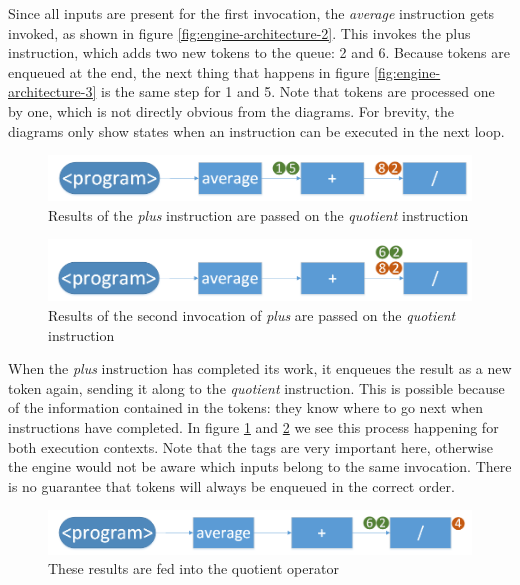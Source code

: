 Since all inputs are present for the first invocation, the \textit{average} instruction gets invoked, as shown in figure \ref{fig:engine-architecture-2}. This invokes the plus instruction, which adds two new tokens to the queue: 2 and 6.
Because tokens are enqueued at the end, the next thing that happens in figure \ref{fig:engine-architecture-3} is the same step for 1 and 5. Note that tokens are processed one by one, which is not directly obvious from the diagrams. For brevity, the diagrams only show states when an instruction can be executed in the next loop.

\begin{figure}[h!]
	\includegraphics[width=\textwidth]{images/Engine-Architecture-4.png}
	\caption{Results of the \textit{plus} instruction are passed on the \textit{quotient} instruction}
	\label{fig:engine-architecture-4}
\end{figure} 

\begin{figure}[h!]
	\includegraphics[width=\textwidth]{images/Engine-Architecture-5.png}
	\caption{Results of the second invocation of \textit{plus} are passed on the \textit{quotient} instruction}
	\label{fig:engine-architecture-5}
\end{figure}

When the \textit{plus} instruction has completed its work, it enqueues the result as a new token again, sending it along to the \textit{quotient} instruction. This is possible because of the information contained in the tokens: they know where to go next when instructions have completed. 
In figure \ref{fig:engine-architecture-4} and \ref{fig:engine-architecture-5} we see this process happening for both execution contexts.
Note that the tags are very important here, otherwise the engine would not be aware which inputs belong to the same invocation. There is no guarantee that tokens will always be enqueued in the correct order.

\begin{figure}[h!]
	\includegraphics[width=\textwidth]{images/Engine-Architecture-6.png}
	\caption{These results are fed into the quotient operator}
	\label{fig:engine-architecture-6}
\end{figure}

